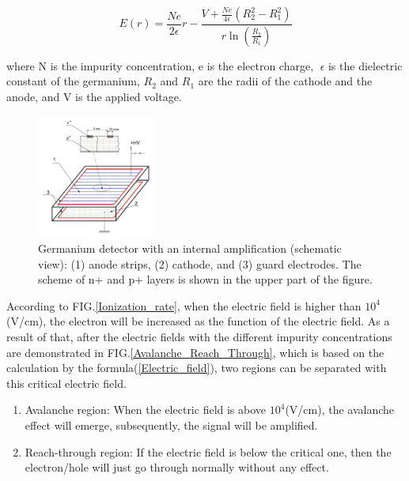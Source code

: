 \documentclass[%
 reprint,
 amsmath,amssymb,
 aps,
]{revtex4-2}
\begin{document}
\begin{equation}
\label{Electric_field}
E(r) = \frac{Ne}{2\epsilon}r-\frac{V+\frac{Ne}{4\epsilon}(R_{2}^{2}-R_{1}^{2})}{r \ln(\frac{R_{2}}{R_{1}})}
\end{equation}

where N is the impurity concentration, e is the electron charge, 􏰊$\epsilon$ is the dielectric constant of the germanium, $R_{2}$ and $R_{1}$ are the radii of the cathode and the anode, and V is the applied voltage.
\begin{figure}[h]
 \centering
 \includegraphics[width=0.35\textwidth]{SHEME/GeIA_Pioneer.png}
 \caption{Germanium detector with an internal amplification (schematic view): (1) anode strips, (2) cathode, and (3) guard electrodes. The scheme of n+ and p+ layers is shown in the upper part of the figure.}
 \label{GeIA_Pioneer}
\end{figure}


According to FIG.\ref{Ionization_rate}, when the electric field is higher than $10^{4}$(V/cm), the electron will be increased as the function of the electric field. As a result of that, after the electric fields with the different impurity concentrations are demonstrated in FIG.\ref{Avalanche_Reach_Through}\cite{1}, which is based on the calculation by the formula(\ref{Electric_field}), two regions can be separated with this critical electric field. 

\begin{enumerate}
	\item Avalanche region: When the electric field is above $10^{4}$(V/cm), the avalanche effect will emerge, subsequently, the signal will be amplified. 
	\item Reach-through region: If the electric field is below the critical one, then the electron/hole will just go through normally without any effect.
\end{enumerate}
\end{document}
